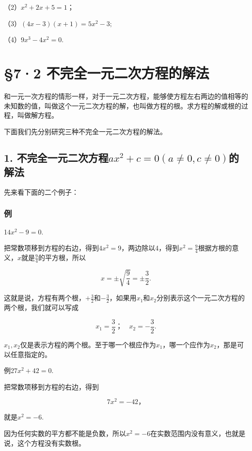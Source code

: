 （2）\(x^{2} + 2x + 5 = 1\)；

（3）\((4x - 3)(x + 1) = 5x^{2} - 3;\)

（4）\(9x^{3} - 4x^{2} = 0.\)

\section{§7·2 不完全一元二次方程的解法}

和一元一次方程的情形一样，对于一元二次方程，能够使方程左右两边的值相等的未知数的值，叫做这个一元二次方程的解，也叫做方程的根。求方程的解或根的过程，叫做解方程。

下面我们先分别研究三种不完全一元二次方程的解法。

\subsection{\texorpdfstring{1. 不完全一元二次方程\(ax^2 + c = 0 (a \neq 0, c \neq 0)\)的解法}{1. 不完全一元二次方程ax\^{}2 + c = 0 (a \textbackslash neq 0, c \textbackslash neq 0)的解法}}

先来看下面的二个例子：

\subsubsection{例}

1\(4x^{2}-9=0.\)

把常数项移到方程的右边，得到\(4x^{2} = 9\)，两边除以4，得到\(x^{2} = \frac{9}{4}\)根据方根的意义，\(x\)就是\(\frac{9}{4}\)的平方根，所以

\[
x = \pm \sqrt {\frac{9}{4}} = \pm \frac{3}{2}.
\]

这就是说，方程有两个根，\(+\frac{3}{2}\)和\(-\frac{3}{2}\)，如果用\(x_{1}\)和\(x_{2}\)分别表示这个一元二次方程的两个根，我们就可以写成

\[
x _ {1} = \frac{3}{2}\text{；} \quad x _ {2} = - \frac{3}{2}.
\]

\(x_{1}, x_{2}\)仅是表示方程的两个根。至于哪一个根应作为\(x_{1}\)，哪一个应作为\(x_{2}\)，那是可以任意指定的。

例2\(7x^{2} + 42 = 0.\)

 把常数项移到方程的右边，得到

\[
7 x ^ {2} = - 42\text{，}
\]

就是\(x^{2} = -6.\)

因为任何实数的平方都不能是负数，所以\(x^{2} = -6\)在实数范围内没有意义，也就是说，这个方程没有实数根。

